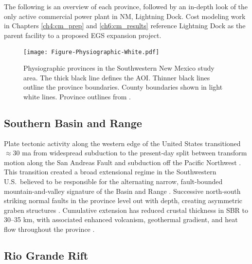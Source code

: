 The following is an overview of each province, followed by an in-depth look of the only active commercial power plant in NM, Lightning Dock. Cost modeling work in Chapters \ref{ch4:cm_prep} and \ref{ch6:cm_results} reference Lightning Dock as the parent facility to a proposed EGS expansion project.

\begin{figure}
\centering
\texttt{[image: Figure-Physiographic-White.pdf]}
\caption[Physiographic provinces of SW New Mexico]{Physiographic provinces in the Southwestern New Mexico study area. The thick black line defines the AOI. Thinner black lines outline the province boundaries. County boundaries shown in light white lines. Province outlines from \protect\citep[~Figure 2-2]{bielicki_hydrogeolgic_2015}.}
\label{fig:phys-provinces}
\end{figure}

\subsection{Southern Basin and Range}\label{ch2:sbr_province}

Plate tectonic activity along the western edge of the United States transitioned $\approx30$ \acrshort{ma} from widespread subduction to the present-day split between transform motion along the San Andreas Fault and subduction off the Pacific Northwest \citep[p.\ 81]{fowler_solid_2005}. This transition created a broad extensional regime in the Southwestern U.S.\ believed to be responsible for the alternating narrow, fault-bounded mountain-and-valley signature of the Basin and Range \citep{henry_real_1992}. Successive north-south striking normal faults in the province level out with depth, creating asymmetric graben structures \citep[p.\ 28-29]{frisch_continental_2011}. Cumulative extension has reduced crustal thickness in SBR to 30--35 km, with associated enhanced volcanism, geothermal gradient, and heat flow throughout the province \citep{lerch_crustal_2007}.

\subsection{Rio Grande Rift}\label{ch2:rgr_province}

